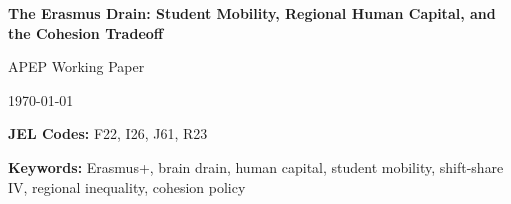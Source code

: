 \documentclass[12pt]{article}
\begin{document}
\begin{titlepage}
\begin{center}
\vspace*{1cm}

{\LARGE\bfseries The Erasmus Drain: Student Mobility, Regional Human Capital, and the Cohesion Tradeoff}

\vspace{1.5cm}

{\large APEP Working Paper}

\vspace{0.5cm}

{\large \today}

\vspace{2cm}

\begin{abstract}
\noindent The EU spends  billion on Cohesion Policy while doubling the Erasmus+ budget to  billion---a program that may drain human capital from the regions Cohesion Policy aims to help. Using shift-share instrumental variables across 970 NUTS3 and 330 NUTS2 European regions, I find that higher Erasmus outflow rates are associated with lower tertiary-educated shares among 25--34-year-olds ($\hat{\beta} = -0.39$ pp, $p < 0.01$). Effects concentrate in peripheral, below-median-GDP regions ($\hat{\beta} = -1.01$, $p < 0.01$) while core regions show no effect. However, the result attenuates under country-by-year fixed effects and randomization inference yields $p = 0.44$. The evidence is suggestive rather than definitive, but points to a tension between mobility subsidies and place-based transfers.
\end{abstract}

\vspace{0.5cm}

\noindent\textbf{JEL Codes:} F22, I26, J61, R23

\noindent\textbf{Keywords:} Erasmus+, brain drain, human capital, student mobility, shift-share IV, regional inequality, cohesion policy

\end{center}
\end{titlepage}

\end{document}
